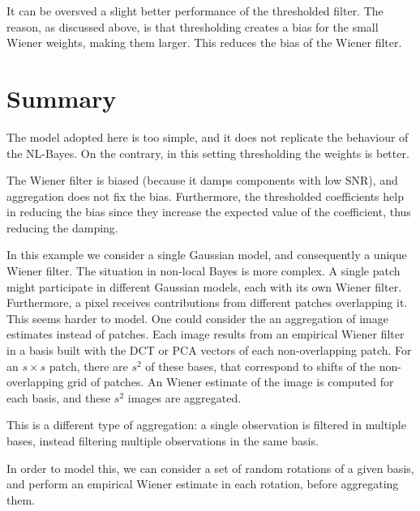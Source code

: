 \documentclass[a4paper,10pt]{article}
\begin{document}
It can be oversved a slight better performance of the thresholded filter. The reason,
as discussed above, is that thresholding creates a bias for the small Wiener
weights, making them larger. This reduces the bias of the Wiener filter.


\section{Summary}

The model adopted here is too simple, and it does not replicate the behaviour of the 
NL-Bayes. On the contrary, in this setting thresholding the weights is better.

The Wiener filter is biased (because it damps components with low SNR), and
aggregation does not fix the bias. 
Furthermore, the thresholded
coefficients help in reducing the bias since they increase the expected value
of the coefficient, thus reducing the damping. 

In this example we consider a single Gaussian model, and consequently a unique
Wiener filter.
The situation in non-local Bayes is more complex. 
A single patch might participate 
in different Gaussian models, each with its own Wiener filter. 
Furthermore, a pixel receives contributions from different patches overlapping
it. This seems harder to model. One could consider the
an aggregation of image estimates instead of patches. Each image results
from an empirical Wiener filter in a basis built with the DCT or
PCA vectors of each non-overlapping patch. For an $s\times s$ patch, there are $s^2$
of these bases, that correspond to shifts of the non-overlapping grid of patches. An
Wiener estimate of the image is computed for each basis, and these $s^2$ images
are aggregated.

This is a different type of aggregation: 
a single observation is filtered in multiple bases, instead filtering multiple
observations in the same basis.

In order to model this, we can consider a set of random rotations of a given basis,
and perform an empirical Wiener estimate in each rotation, before aggregating them. 
\end{document}
